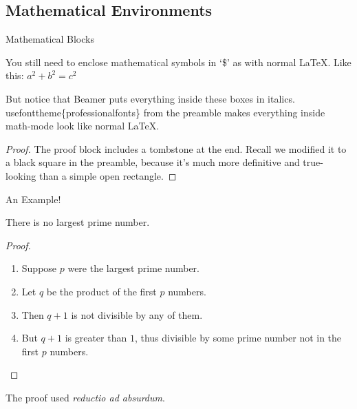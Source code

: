 \documentclass{beamer}
\begin{document}
\subsection{Mathematical Environments}


\begin{frame}{Mathematical Blocks}
	
	\begin{theorem}
		You still need to enclose mathematical symbols in `\$' as with normal \LaTeX. Like this: $a^2 + b^2 = c^2$
	\end{theorem}
	
	\begin{corollary}
		But notice that Beamer puts everything inside these boxes in italics. \alert{usefonttheme\{professionalfonts\}} from the preamble makes everything inside math-mode look like normal \LaTeX.
	\end{corollary}
	
	\begin{proof}
		The proof block includes a tombstone at the end. Recall we modified it to a black square in the preamble, because it's much more definitive and true-looking than a simple open rectangle.
	\end{proof}
	
\end{frame}


\begin{frame}{An Example!}

	\begin{theorem}
		There is no largest prime number.
	\end{theorem}
	
	\begin{proof}
		\begin{enumerate}
			\item Suppose $p$ were the largest prime number.
			\item Let $q$ be the product of the first $p$ numbers.
			\item Then $q + 1$ is not divisible by any of them.
			\item But $q + 1$ is greater than $1$, thus divisible by some prime
					number not in the first $p$ numbers.\qedhere	
		\end{enumerate}
	\end{proof}
	
	The proof used \textit{reductio ad absurdum}.		%
			
\end{frame}
\end{document}
